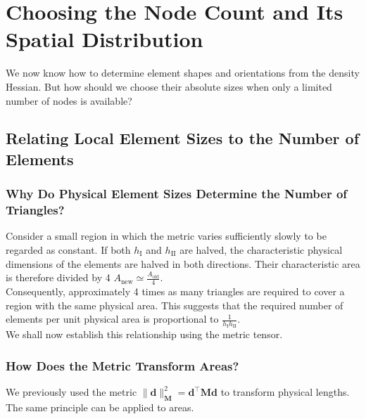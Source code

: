 \documentclass[11pt,a4paper]{article}
\begin{document}



\section{Choosing the Node Count and Its Spatial Distribution}

We now know how to determine element shapes and orientations from the density Hessian. But how should we choose their absolute sizes when only a limited number of nodes is available?


\subsection{Relating Local Element Sizes to the Number of Elements}

\subsubsection{Why Do Physical Element Sizes Determine the Number of Triangles?}

\noindent
Consider a small region in which the metric varies sufficiently slowly to be regarded as constant. If both $h_{\mathrm I}$ and $h_{\mathrm{II}}$ are halved, the characteristic physical dimensions of the elements are halved in both directions. Their characteristic area is therefore divided by 4 $A_{\mathrm{new}}\simeq\frac{A_{\mathrm{old}}}{4}$.\\

\noindent
Consequently, approximately 4 times as many triangles are required to cover a region with the same physical area. This suggests that the required number of elements per unit physical area is proportional to $\frac{1}{h_{\mathrm I}h_{\mathrm{II}}}$.\\

\noindent
We shall now establish this relationship using the metric tensor.


\subsubsection{How Does the Metric Transform Areas?}
\noindent
We previously used the metric $\|\mathbf d\|_{\mathbf M}^{2}
=\mathbf d^{\top}\mathbf M\mathbf d$ to transform physical lengths. The same principle can be applied to areas.\\ 
\end{document}
